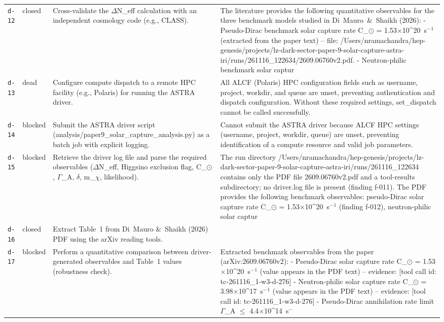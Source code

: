 \documentclass[11pt,a4paper]{article}
\begin{document}
\begin{longtable}{@{}p{}p{}p{}p{}@{}}
\texttt{d-12} & closed & Cross-validate the $\Delta$N\_eff calculation with an independent cosmology code (e.g., CLASS). & The literature provides the following quantitative observables for the three benchmark models studied in Di~Mauro~\&~Shaikh (2026):
- Pseudo-Dirac benchmark solar capture rate C\_$\odot$ = 1.53$\times$10\textasciicircum{}20~s$^-$$^1$ (extracted from the paper text) -- file: /Users/nramachandra/hep-genesis/projects/lz-dark-sector-paper-9-solar-capture-astra-iri/runs/261116\_122634/2609.06760v2.pdf.
- Neutron-philic benchmark solar captur \\
\texttt{d-13} & dead & Configure compute dispatch to a remote HPC facility (e.g., Polaris) for running the ASTRA driver. & All ALCF (Polaris) HPC configuration fields such as username, project, workdir, and queue are unset, preventing authentication and dispatch configuration. Without these required settings, set\_dispatch cannot be called successfully. \\
\texttt{d-14} & blocked & Submit the ASTRA driver script (analysis/paper9\_solar\_capture\_analysis.py) as a batch job with explicit logging. & Cannot submit the ASTRA driver because ALCF HPC settings (username, project, workdir, queue) are unset, preventing identification of a compute resource and valid job parameters. \\
\texttt{d-15} & blocked & Retrieve the driver log file and parse the required observables ($\Delta$N\_eff, Higgsino exclusion flag, C\_$\odot$, $\Gamma$\_A, $\delta$, m\_$\chi$, likelihood). & The run directory /Users/nramachandra/hep-genesis/projects/lz-dark-sector-paper-9-solar-capture-astra-iri/runs/261116\_122634 contains only the PDF file 2609.06760v2.pdf and a tool-results subdirectory; no driver.log file is present (finding f-011). The PDF provides the following benchmark observables: pseudo-Dirac solar capture rate C\_$\odot$ = 1.53$\times$10\textasciicircum{}20~s$^-$$^1$ (finding f-012), neutron-philic solar captur \\
\texttt{d-16} & closed & Extract Table~1 from Di~Mauro \&~Shaikh (2026) PDF using the arXiv reading tools. &  \\
\texttt{d-17} & blocked & Perform a quantitative comparison between driver-generated observables and Table~1 values (robustness check). & Extracted benchmark observables from the paper (arXiv:2609.06760v2):
- Pseudo-Dirac solar capture rate C\_$\odot$ = 1.53$\times$10\textasciicircum{}20~s$^-$$^1$ (value appears in the PDF text) -- evidence: [tool call id: tc-261116\_1-w3-d-276]
- Neutron-philic solar capture rate C\_$\odot$ = 3.98$\times$10\textasciicircum{}17~s$^-$$^1$ (value appears in the PDF text) -- evidence: [tool call id: tc-261116\_1-w3-d-276]
- Pseudo-Dirac annihilation rate limit $\Gamma$\_A $\leq$ 4.4$\times$10\textasciicircum{}14~s$^-$ \\
\bottomrule\end{longtable}
\end{document}
